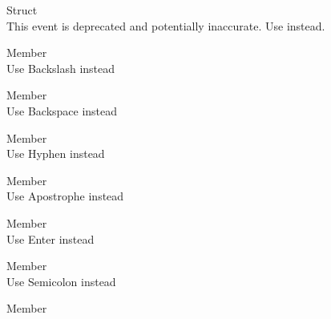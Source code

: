 \begin{DoxyRefList}
\item[Struct \doxylink{structsf_1_1_event_1_1_mouse_wheel_event}{sf\+::Event\+::Mouse\+Wheel\+Event} ]\hfill \\
\label{deprecated__deprecated000023}%
%
This event is deprecated and potentially inaccurate. Use  instead. 
\item[Member \doxylink{classsf_1_1_keyboard_acb4cacd7cc5802dec45724cf3314a142a536df84e73859aa44e11e192459470b6}{sf\+::Keyboard\+::Back\+Slash} ]\hfill \\
\label{deprecated__deprecated000027}%
%
Use Backslash instead  
\item[Member \doxylink{classsf_1_1_keyboard_acb4cacd7cc5802dec45724cf3314a142a33aeaab900abcd01eebf2fcc4f6d97e2}{sf\+::Keyboard\+::Back\+Space} ]\hfill \\
\label{deprecated__deprecated000026}%
%
Use Backspace instead  
\item[Member \doxylink{classsf_1_1_keyboard_acb4cacd7cc5802dec45724cf3314a142a401a183dcfde0a06cb60fe6c91fa1e39}{sf\+::Keyboard\+::Dash} ]\hfill \\
\label{deprecated__deprecated000025}%
%
Use Hyphen instead  
\item[Member \doxylink{classsf_1_1_keyboard_acb4cacd7cc5802dec45724cf3314a142af031edb6bcf319734a6664388958c475}{sf\+::Keyboard\+::Quote} ]\hfill \\
\label{deprecated__deprecated000030}%
%
Use Apostrophe instead  
\item[Member \doxylink{classsf_1_1_keyboard_acb4cacd7cc5802dec45724cf3314a142ac291de81bdee518d636bc359f2ca77de}{sf\+::Keyboard\+::Return} ]\hfill \\
\label{deprecated__deprecated000029}%
%
Use Enter instead  
\item[Member \doxylink{classsf_1_1_keyboard_acb4cacd7cc5802dec45724cf3314a142a460ab09a36f9ed230504b89b9815de88}{sf\+::Keyboard\+::Semi\+Colon} ]\hfill \\
\label{deprecated__deprecated000028}%
%
Use Semicolon instead  
\item[Member \doxylink{classsf_1_1_keyboard_acb4cacd7cc5802dec45724cf3314a142a90be0882086bccb516e3afc5c7fb82eb}{sf\+::Keyboard\+::Tilde} ]\hfill \\

\end{DoxyRefList}
